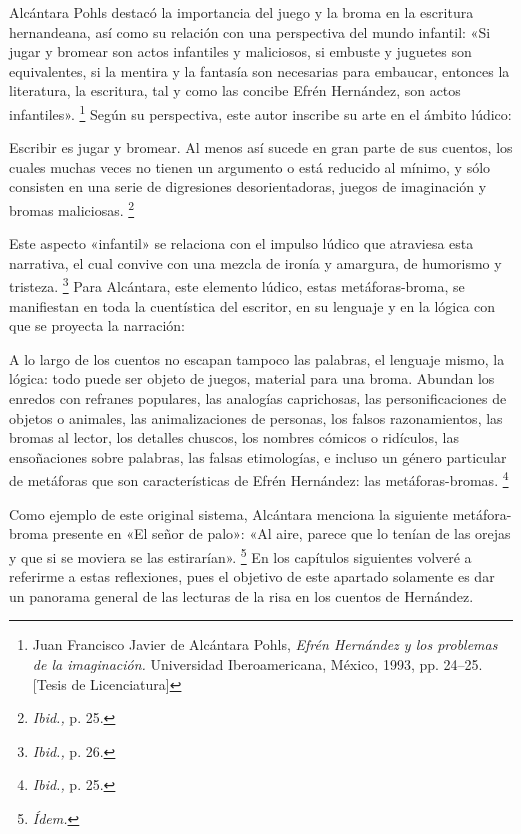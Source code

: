 \documentclass[14pt,twoside,final]{extbook} %
\let\oldfootnote\footnote
\renewcommand\footnote[1]{%
\oldfootnote{\hspace{1mm}#1}}
\begin{document}
Alcántara Pohls destacó la importancia del juego y la broma en la escritura hernandeana, así como su relación con una perspectiva del mundo infantil: «Si jugar y bromear son actos infantiles y maliciosos, si embuste y juguetes son equivalentes, si la mentira y la fantasía son necesarias para embaucar, entonces la literatura, la escritura, tal y como las concibe Efrén Hernández, son actos infantiles».\footnote{Juan Francisco Javier de Alcántara Pohls, \emph{Efrén Hernández y los problemas de la imaginación.} Universidad Iberoamericana, México, 1993, pp. 24--25. [Tesis de Licenciatura]} Según su perspectiva, este autor inscribe su arte en el ámbito lúdico:\protect\enlargethispage*{\baselineskip}
\begin{quoting}
Escribir es jugar y bromear. Al menos así sucede en gran parte de sus cuentos, los cuales muchas veces no tienen un argumento o está reducido al mínimo, y sólo consisten en una serie de digresiones desorientadoras, juegos de imaginación y bromas maliciosas.\footnote{\emph{Ibid.,} p. 25.}
\end{quoting}
Este aspecto «infantil» se relaciona con el impulso lúdico que atraviesa esta narrativa, el cual convive con una mezcla de ironía y amargura, de humorismo y tristeza.\footnote{\emph{Ibid.,} p. 26.} Para Alcántara, este elemento lúdico, estas \mbox{metáforas-broma}, se manifiestan en toda la cuentística del escritor, en su lenguaje y en la lógica con que se proyecta la narración:
\begin{quoting}
A lo largo de los cuentos no escapan tampoco las palabras, el lenguaje mismo, la lógica: todo puede ser objeto de juegos, material para una broma. Abundan los enredos con refranes populares, las analogías caprichosas, las personificaciones de objetos o animales, las animalizaciones de personas, los falsos razonamientos, las bromas al lector, los detalles chuscos, los nombres cómicos o ridículos, las ensoñaciones sobre palabras, las falsas etimologías, e incluso un género particular de metáforas que son características de Efrén Hernández: las metáforas-bromas.\footnote{\emph{Ibid.,} p. 25.}
\end{quoting}
Como ejemplo de este original sistema, Alcántara menciona la siguiente metáfora-broma presente en «El señor de palo»: «Al aire, parece que lo tenían de las orejas y que si se moviera se las estirarían».\footnote{\em Ídem.} En los capítulos siguientes volveré a referirme a estas reflexiones, pues el objetivo de este apartado solamente es dar un panorama general de las lecturas de la risa en los cuentos de Hernández.
\end{document}
